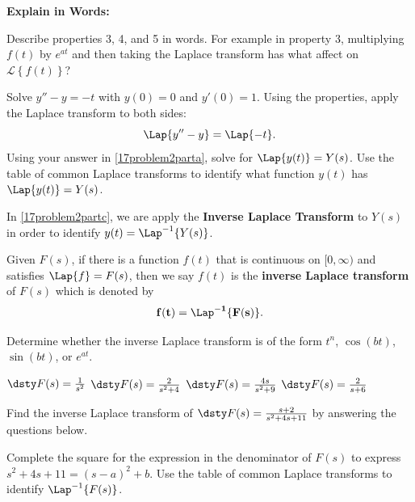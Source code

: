  \textbf{Explain in Words:}

\bb
\ii Describe properties 3, 4, and 5 in words. For example in property 3, multiplying $f(t)$ by $e^{at}$ and then taking the Laplace transform has what affect on $\mathscr{L} \left\{ f(t) \right\}$? \label{17problem1}
\ee

\clearpage


\bb[resume]
\ii Solve $y''-y=-t$ with $y(0)=0$ and $y'(0)=1$.
\bb
\ii Using the properties, apply the Laplace transform to both sides: \label{17problem2parta}
\[ \Lap \{ y'' -y \} = \Lap \{ -t \} .\]
\vfill
\ii Using your answer in \ref{17problem2parta}, solve for $\Lap \{ y(t) \}=Y(s)$.  \label{17problem2partb}
\vfill
\ii Use the table of common Laplace transforms to identify what function $y(t)$ has $\Lap \{ y(t) \}=Y(s)$. \label{17problem2partc}
\vfill
\ee
\ee

In \ref{17problem2partc}, we are apply the \textbf{Inverse Laplace Transform} to $Y(s)$ in order to identify $y(t) = \Lap^{-1} \{ Y(s) \}$.

\clearpage


Given $F(s)$, if there is a function $f(t)$ that is continuous on $\lbrack 0 , \infty )$ and satisfies $\Lap \{ f \} = F(s)$, then
we say $f(t)$ is the \textbf{inverse Laplace transform} of $F(s)$ which is denoted by
\[ \mathbf{f(t) = \Lap^{-1} \{ F(s) \}} .\]

\bb[resume]
\ii Determine whether the inverse Laplace transform is of the form $t^n$, $\cos{(bt)}$, $\sin{(bt)}$, or $e^{at}$.  \label{17problem3}

\bb
\ii $\dsty F(s) = \frac{1}{s^2}$  \label{17problem3a} %
\vfill
\ii $\dsty F(s) = \frac{2}{s^2+4}$  \label{17problem3b}%
\vfill
\ii $\dsty F(s) = \frac{4s}{s^2+9}$  \label{17problem3c}%
\vfill
\ii $\dsty F(s) = \frac{2}{s+6}$  \label{17problem3d}%
\vfill
\ee

\ii Find the inverse Laplace transform of $\dsty F(s) = \frac{s+2}{s^2+4s+11}$ by answering the questions below.  \label{17problem4}

\bb
\ii Complete the square for the expression in the denominator of $F(s)$ to express \newline $s^2+4s+11=(s-a)^2+b$. \label{17problem4a}
\vfill
\ii Use the table of common Laplace transforms to identify $\Lap^{-1} \{ F(s)\}$. \label{17problem4b}
\vfill
\ee

